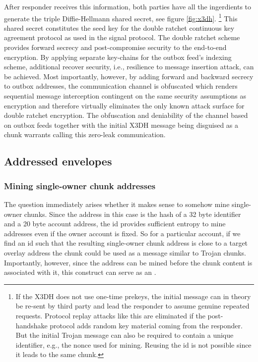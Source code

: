After responder receives this information, both parties have all the ingerdients to generate the triple Diffie-Hellmann shared secret, see figure \ref{fig:x3dh}.%
%
\footnote{If the X3DH does not use one-time prekeys, the initial message can in theory be re-sent by third party and lead the responder to assume genuine repeated requests. Protocol replay attacks like this are eliminated if the post-handshake protocol adds random key material coming from the responder. 
But the initial Trojan message can also be required to contain a unique identifier, e.g., the nonce used for mining. Reusing the id is not possible since it leads to the same chunk.}
%
This shared secret constitutes the seed key for the double ratchet continuous key agreement protocol as used in the signal protocol. The double ratchet scheme provides forward secrecy and post-compromise security to the end-to-end encryption. By applying separate key-chains for the outbox feed's indexing scheme, additional recover security, i.e., resilience to message insertion attack, can be achieved. Most importantly, however, by adding forward and backward secrecy to outbox addresses, the communication channel is obfuscated which renders sequential message interception contingent on the same security assumptions as encryption and therefore virtually eliminates the only known attack surface for double ratchet encryption. The obfuscation and deniability of the channel based on outbox feeds together with the initial X3DH message being disguised as a chunk warrants calling this zero-leak communication.

\subsection{Addressed envelopes\statusgreen}\label{sec:addressed-envelopes}

\subsubsection{Mining single-owner chunk addresses}

The question immediately arises whether it makes sense to somehow mine single-owner chunks. Since the address in this case is the hash of a 32 byte identifier and a 20 byte account address, the id provides sufficient entropy to mine addresses even if the owner account is fixed. So for a particular account, if we find an id such that the resulting single-owner chunk address is close to a target overlay address the chunk could be used as a message similar to Trojan chunks. Importantly, however, since the address can be mined before the chunk content is associated with it, this construct can serve as an .

